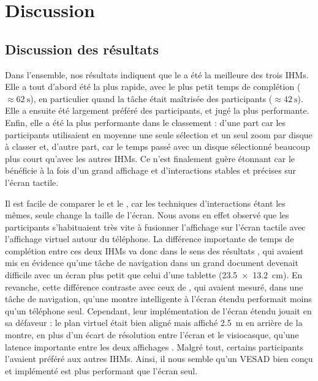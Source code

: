 \chapter{Discussion}
\label{ch:discussion}

\section{Discussion des résultats}
\label{sec:discussion_lessons}

Dans l'ensemble, nos résultats indiquent que le  a été la meilleure des trois IHMs. Elle a tout d'abord été la plus rapide, avec le plus petit temps de complétion ($\approx \SI{62}{\s}$), en particulier quand la tâche était maîtrisée des participants ($\approx \SI{42}{\s}$). Elle a ensuite été largement préféré des participants, et jugé la plus performante. Enfin, elle a été la plus performante dans le classement : d'une part car les participants utilisaient en moyenne une seule sélection et un seul zoom par disque à classer et, d'autre part, car le temps passé avec un disque sélectionné beaucoup plus court qu'avec les autres IHMs. Ce n'est finalement guère étonnant car le  bénéficie à la fois d'un grand affichage et d'interactions stables et précises sur l'écran tactile.

Il est facile de comparer le  et le , car les techniques d'interactions étant les mêmes, seule change la taille de l'écran. Nous avons en effet observé que les participants s'habituaient très vite à fusionner l'affichage sur l'écran tactile avec l'affichage virtuel autour du téléphone. La différence importante de temps de complétion entre ces deux IHMs va donc dans le sens des résultats \cite{Raedle2014}, qui avaient mis en évidence qu'une tâche de navigation dans un grand document devenait difficile avec un écran plus petit que celui d'une tablette (\SI{23.5x13.2}{\cm}). En revanche, cette différence contraste avec ceux de \cite{Grubert2015}, qui avaient mesuré, dans une tâche de navigation, qu'une montre intelligente à l'écran étendu performait moins qu'un téléphone seul. Cependant, leur implémentation de l'écran étendu jouait en sa défaveur : le plan virtuel était bien aligné mais affiché \SI{2.5}{\m} en arrière de la montre, en plus d'un écart de résolution entre l'écran et le visiocasque, qu'une latence importante entre les deux affichages . Malgré tout, certains participants l'avaient préféré aux autres IHMs. Ainsi, il nous semble qu'un VESAD bien conçu et implémenté est plus performant que l'écran seul.

